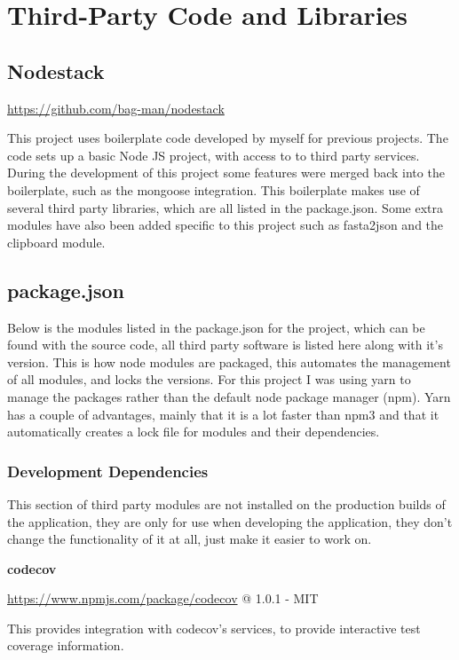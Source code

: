 \chapter{Third-Party Code and Libraries}
\section{Nodestack}

\url{https://github.com/bag-man/nodestack}

This project uses boilerplate code developed by myself for previous projects. The code sets up a basic Node JS project, with access to to third party services. During the development of this project some features were merged back into the boilerplate, such as the mongoose integration.  This boilerplate makes use of several third party libraries, which are all listed in the package.json. Some extra modules have also been added specific to this project such as fasta2json and the clipboard module. 

\section{package.json}
Below is the modules listed in the package.json for the project, which can be found with the source code, all third party software is listed here along with it's version. This is how node modules are packaged, this automates the management of all modules, and locks the versions. For this project I was using yarn\cite{yarn} to manage the packages rather than the default node package manager (npm)\cite{npm}. Yarn has a couple of advantages, mainly that it is a lot faster than npm3 and that it automatically creates a lock file for modules and their dependencies. 

\subsection{Development Dependencies}
  This section of third party modules are not installed on the production builds of the application, they are only for use when developing the application, they don't change the functionality of it at all, just make it easier to work on. 

\textbf{codecov} 

\url{https://www.npmjs.com/package/codecov} @ 1.0.1 - MIT

This provides integration with codecov's services, to provide interactive test coverage information.

